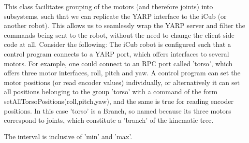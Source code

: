 This class facilitates grouping of the motors (and therefore joints) into subsystems, such that we can replicate the YARP interface to the iCub (or another robot). This allows us to seamlessly wrap the YARP server and filter the commands being sent to the robot, without the need to change the client side code at all. Consider the following: The iCub robot is configured such that a control program connects to a YARP port, which offers interfaces to several motors. For example, one could connect to an RPC port called 'torso', which offers three motor interfaces, roll, pitch and yaw. A control program can set the motor positions (or read encoder values) individually, or alternatively it can set all positions belonging to the group 'torso' with a command of the form setAllTorsoPositions(roll,pitch,yaw), and the same is true for reading encoder positions. In this case 'torso' is a Branch, so named because its three motors correspond to joints, which constitute a 'branch' of the kinematic tree.

The interval is inclusive of 'min' and 'max'. 